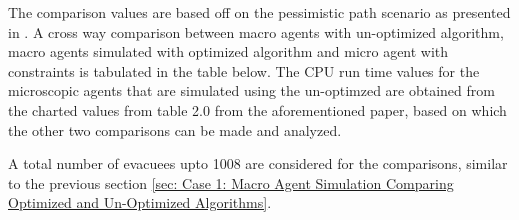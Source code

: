 The comparison values are based off on the pessimistic path scenario as presented in \cite{ref5}. A cross way comparison between macro agents with un-optimized algorithm, macro agents simulated with optimized algorithm and micro agent with constraints is tabulated in the table below. The CPU run time values for the microscopic agents that are simulated using the un-optimzed are obtained from the charted values from table 2.0 from the aforementioned paper, based on which the other two comparisons can be made and analyzed.

A total number of evacuees upto 1008 are considered for the comparisons, similar to the previous section \ref{sec: Case 1: Macro Agent Simulation Comparing Optimized and Un-Optimized Algorithms}. 

\begin{table}
\centering
\begin{adjustbox}{angle=270}
\end{adjustbox}
\end{table}
